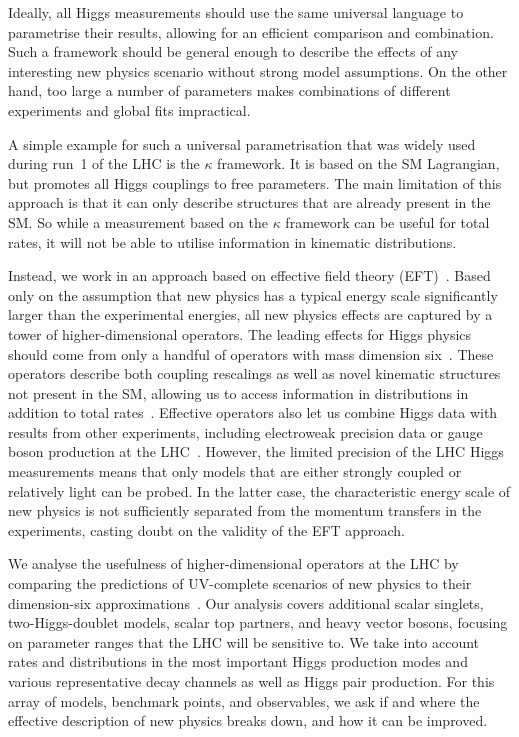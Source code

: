 \newparagraph
%
Ideally, all Higgs measurements should use the same universal language
to parametrise their results, allowing for an efficient comparison
and combination. Such a framework should be general enough to describe
the effects of any interesting new physics scenario without strong model
assumptions. On the other hand, too large a number of parameters makes
combinations of different experiments and global fits impractical.

A simple example for such a universal parametrisation that was widely
used during run~1 of the LHC is the $\kappa$ framework. It is based on
the SM Lagrangian, but promotes all Higgs couplings to free
parameters. The main limitation of this approach is that it can only
describe structures that are already present in the SM. So while a
measurement based on the $\kappa$ framework can be useful for total
rates, it will not be able to utilise information in kinematic
distributions.

Instead, we work in an approach based on effective field theory
(EFT)~\cite{Coleman:1969sm, Callan:1969sn, Weinberg:1980wa}. Based
only on the assumption that new physics has a typical energy scale
significantly larger than the experimental energies, all new physics
effects are captured by a tower of higher-dimensional operators. The
leading effects for Higgs physics should come from only a handful of
operators with mass dimension six~\cite{Burges:1983zg, Leung:1984ni,
  Buchmuller:1985jz}. These operators
%
%
describe both coupling rescalings as well as novel kinematic
structures not present in the SM, allowing us to access information in
distributions in addition to total rates~\cite{Corbett:2012ja,
  Corbett:2015ksa}. Effective operators also let us combine Higgs data
with results from other experiments, including electroweak precision
data or gauge boson production at the
LHC~\cite{Butter:2016cvz}. However, the limited precision of the LHC
Higgs measurements means that only models that are either strongly
coupled or relatively light can be probed. In the latter case, the
characteristic energy scale of new physics is not sufficiently
separated from the momentum transfers in the experiments, casting
doubt on the validity of the EFT approach.

We analyse the usefulness of higher-dimensional operators at the LHC
by comparing the predictions of UV-complete scenarios of new physics
to their dimension-six approximations~\cite{Brehmer:2015rna}. Our
analysis covers additional scalar singlets, two-Higgs-doublet models,
scalar top partners, and heavy vector bosons, focusing on parameter
ranges that the LHC will be sensitive to. We take into account rates
and distributions in the most important Higgs production modes and
various representative decay channels as well as Higgs pair
production. For this array of models, benchmark points, and
observables, we ask if and where the effective description of new
physics breaks down, and how it can be improved.

